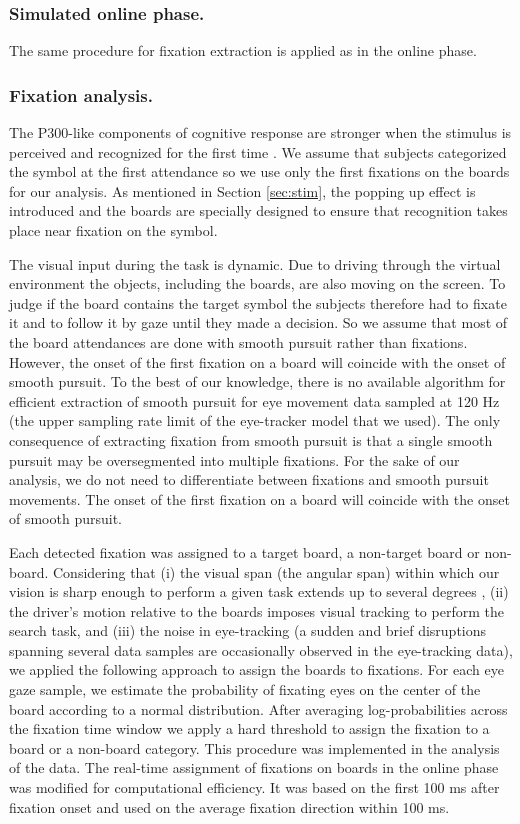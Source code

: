 \documentclass[12pt]{iopart}
\begin{document}
\subsubsection*{Simulated online phase.}
The same procedure for fixation extraction is applied as in the online phase.

\subsubsection*{Fixation analysis.}
\label{sec:fixanal}
The P300-like components of cognitive response are stronger when the stimulus is perceived and recognized
for the first time \cite{devillez_p300_2015}. 
We assume that subjects categorized the symbol at the first
attendance so we use only the first fixations on the boards for our analysis.
As mentioned in Section \ref{sec:stim}, the popping up effect is introduced 
and the boards are specially designed to ensure that
recognition takes place near fixation on the symbol.

The visual input during the task is dynamic. Due to driving through
the virtual environment the objects, including the boards, are also moving on the screen. To judge if the board contains the target symbol the subjects therefore had to fixate it and to follow it by gaze until they made a decision.
So we assume that most of the board attendances are done with
smooth pursuit rather than fixations. However, the onset of the first fixation on a board will coincide with the onset of smooth pursuit.
To the best of our knowledge, there is no available algorithm for efficient
extraction of smooth pursuit for eye movement data sampled at 120 Hz (the upper sampling rate limit of the eye-tracker model that we used). The only consequence of 
extracting fixation from smooth pursuit is that a single smooth pursuit
may be oversegmented into multiple fixations.
For the sake of our analysis, we do not need to differentiate between
fixations and smooth pursuit movements. The onset of the first fixation on a board
will coincide with the onset of smooth pursuit.

Each detected fixation was assigned to a target board, a non-target board or non-board.
Considering that (i) the visual span (the angular span) within which our vision is sharp enough to perform a given task extends up to several degrees \cite{legge_psychophysics_2001}, (ii) the driver's motion relative to the boards imposes visual tracking to perform the search task, and (iii) the noise in eye-tracking (a sudden and brief disruptions spanning several data samples are occasionally observed in the eye-tracking data), we applied the following approach to assign the boards to fixations. For each eye gaze sample, we estimate the probability of
fixating eyes on the center of the board according to a normal distribution.
After averaging log-probabilities across the fixation time window we apply a hard
threshold to assign the fixation to a board or a non-board category.
This procedure was implemented in the analysis of the data.
The real-time assignment of fixations on boards in the online phase was
modified for computational efficiency. It was based
on the first 100 ms after fixation onset and
used on the average fixation direction within 100 ms.
\end{document}
